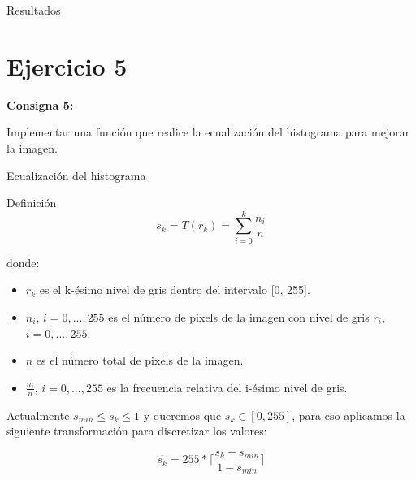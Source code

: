 \documentclass{beamer}
\begin{document}
\begin{frame}[fragile]{Resultados}
\begin{minipage}{0.45\linewidth}
		\label{fig:lenaej4}
	\end{minipage}
\end{frame}

\section{Ejercicio 5}

\begin{frame}
	\begin{center}
		\textcolor{unahurverde}{\textbf{Consigna 5:}}
	\end{center}
	\justifying
	
	Implementar una función que realice la ecualización del histograma para mejorar la imagen.
\end{frame}

\begin{frame}[fragile]{Ecualización del histograma}
	\justifying
	
	\begin{block}{Definición}
		\[
		s_k = T(r_k) = \sum_{i=0}^{k} \frac{n_i}{n}
		\]
	\end{block}
	
	donde:
	
	\begin{itemize}
		\item $r_k$ es el k-ésimo nivel de gris dentro del intervalo [0, 255].
		\item $n_i$, $i=0,...,255$ es el número de pixels de la imagen con nivel de gris $r_i$, $i=0,...,255$.
		\item $n$ es el número total de pixels de la imagen.
		\item $\frac{n_i}{n}$, $i=0,...,255$ es la frecuencia relativa del i-ésimo nivel de gris.
	\end{itemize}
	
	Actualmente $s_{min} \leq s_k \leq 1$ y queremos que $s_k \in [0, 255]$, para eso aplicamos la siguiente transformación para discretizar los valores:
	
	\[
	\hat{s_k} = 255 * \lceil \frac{s_k - s_{min}}{1 - s_{min}} \rceil
	\]
\end{frame}
\end{document}
